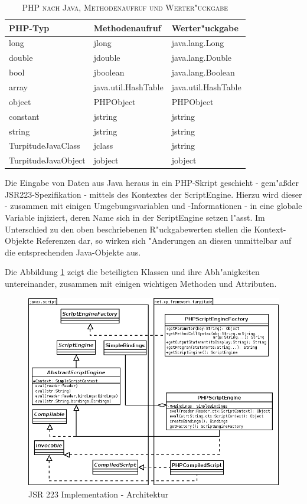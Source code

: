 \begin{table}
\label{tab:phptojava}
\caption{\textsc{PHP nach Java, Methodenaufruf und Werter"uckgabe}}
\begin{tabular}[tbh]{|l|l|l|}
\hline
PHP-Typ & Methodenaufruf & Werter"uckgabe\\
\hline\hline
long & jlong & java.lang.Long \\
double & jdouble & java.lang.Double \\
bool & jboolean  & java.lang.Boolean \\
array & java.util.HashTable & java.util.HashTable \\
object & PHPObject & PHPObject\\
constant & jstring & jstring\\
string & jstring & jstring \\
TurpitudeJavaClass & jclass & jstring\\
TurpitudeJavaObject & jobject & jobject\\
\hline
\end{tabular}
\end{table}


Die Eingabe von Daten aus Java heraus in ein PHP-Skript geschieht - gem"a\ss der JSR223-Spezifikation - mittels des Kontextes der
ScriptEngine. Hierzu wird dieser - zusammen mit einigen Umgebungsvariablen und -Informationen - in eine globale Variable injiziert,
deren Name sich in der ScriptEngine setzen l"asst. Im Unterschied zu den oben beschriebenen R"uckgabewerten stellen die Kontext-Objekte
Referenzen dar, so wirken sich "Anderungen an diesen unmittelbar auf die entsprechenden Java-Objekte aus.

Die Abbildung \ref{fig:jsr223impl} zeigt die beteiligten Klassen und ihre Abh"anigkeiten untereinander,
zusammen mit einigen wichtigen Methoden und Attributen. 

\begin{figure}[h]
\includegraphics[width=\textwidth]{chap1/img/turpitude.png}
\caption{JSR 223 Implementation - Architektur}
\label{fig:jsr223impl}
\end{figure}

